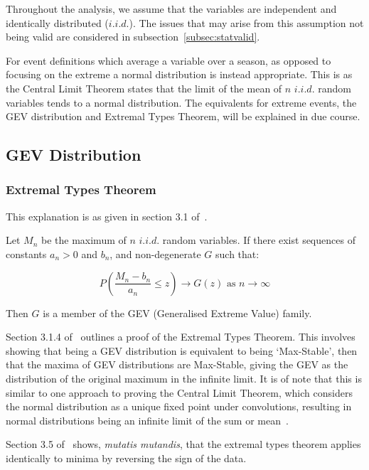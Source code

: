 Throughout the analysis,
    we assume that the variables are independent and identically distributed ($i.i.d.$).
The issues that may arise from this assumption not being valid are considered in subsection~\ref{subsec:statvalid}.

For event definitions which average a variable over a season,
    as opposed to focusing on the extreme
    a normal distribution is instead appropriate.
This is as the Central Limit Theorem states that the limit of the mean of $n$ $i.i.d.$ random variables tends to a normal distribution.
The equivalents for extreme events, the GEV distribution and Extremal Types Theorem,
    will be explained in due course.

\subsection{GEV Distribution}\label{subsec:gev}

\subsubsection{Extremal Types Theorem}

This explanation is as given in section 3.1 of~\cite{Coles_2001}.

Let $M_n$ be the maximum of $n$ $i.i.d.$ random variables.
If there exist sequences of constants $a_n > 0$ and $b_n$, and non-degenerate $G$ such that:

\[ P\left( \frac{M_n - b_n}{a_n}  \leq z \right) \rightarrow G(z) \text{ as } n \rightarrow \infty \]

Then $G$ is a member of the GEV (Generalised Extreme Value) family.

Section 3.1.4  of~\cite{Coles_2001} outlines a proof of the Extremal Types Theorem.
This involves showing that being a GEV distribution is equivalent to being `Max-Stable',
    then that the maxima of GEV distributions are Max-Stable,
    giving the GEV as the distribution of the original maximum in the infinite limit.
It is of note that this is similar to one approach to proving the Central Limit Theorem,
    which considers the normal distribution as a unique fixed point under convolutions,
    resulting in normal distributions being an infinite limit of the sum or mean~\cite{Hamedani_Walter_1984}.

Section 3.5 of~\cite{Coles_2001} shows, \textit{mutatis mutandis},
    that the extremal types theorem applies identically to minima by reversing the sign of the data.

